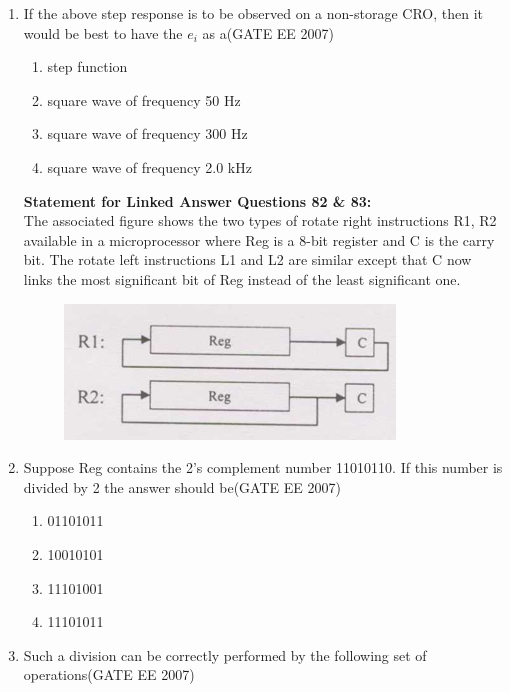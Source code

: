 \documentclass[a4paper,10pt]{exam}
\theoremstyle{remark}
\begin{document}
\begin{enumerate}
\item  If the above step response is to be observed on a non-storage CRO, then it would be best to have the $e_i$ as a\hfill{(GATE EE 2007)}

\begin{multicols}{2}
\begin{enumerate}
 \item  step function 
\item square wave of frequency 50 Hz 
\item  square wave of frequency 300 Hz 
\item  square wave of frequency 2.0 kHz
\end{enumerate}
\end{multicols}
\newpage
\noindent
\textbf{Statement for Linked Answer Questions 82 \& 83:}\\
The associated figure shows the two types of rotate right instructions R1, R2 available in a microprocessor where Reg is a 8-bit register and C is the carry bit. The rotate left instructions L1 and L2 are similar except that C now links the most significant bit of Reg instead of the least significant one.

\vspace{0.5em}

\begin{figure}[H]
    \centering
    \includegraphics[width=0.5\linewidth]{figs/Q 82,83.png} \caption{}     \label{fig:myfigure}
\end{figure}

\item 
Suppose Reg contains the 2's complement number 11010110. If this number is divided by 2 the answer should be\hfill{(GATE EE 2007)}

\begin{multicols}{4}
\begin{enumerate}
    \item  01101011 
 \item  10010101 
 \item  11101001 
 \item  11101011 
\end{enumerate}
\end{multicols}
\item  Such a division can be correctly performed by the following set of operations\hfill{(GATE EE 2007)}


\end{enumerate}
\end{document}
